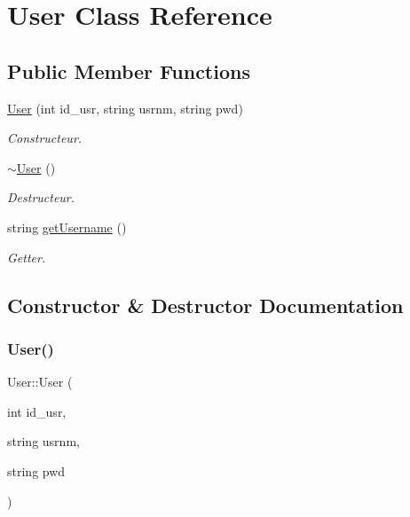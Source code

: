 \hypertarget{classUser}{}\section{User Class Reference}
\label{classUser}
\subsection*{Public Member Functions}
\begin{DoxyCompactItemize}
\item 
\mbox{\hyperlink{classUser_a5342d3ba10c77b51736c14faee0b8d65}{User}} (int id\+\_\+usr, string usrnm, string pwd)
\begin{DoxyCompactList}\small\item\em Constructeur. \end{DoxyCompactList}\item 
\mbox{\hyperlink{classUser_ac00b72ad64eb4149f7b21b9f5468c2b2}{$\sim$\+User}} ()
\begin{DoxyCompactList}\small\item\em Destructeur. \end{DoxyCompactList}\item 
string \mbox{\hyperlink{classUser_a5705c32c347050449ba6d72f32f18482}{get\+Username}} ()
\begin{DoxyCompactList}\small\item\em Getter. \end{DoxyCompactList}\end{DoxyCompactItemize}


\subsection{Constructor \& Destructor Documentation}
\mbox{\label{classUser_a5342d3ba10c77b51736c14faee0b8d65}} 
\subsubsection{\texorpdfstring{User()}{User()}}
{\footnotesize\ttfamily User\+::\+User (\begin{DoxyParamCaption}\item[{int}]{id\+\_\+usr,  }\item[{string}]{usrnm,  }\item[{string}]{pwd }\end{DoxyParamCaption})}



